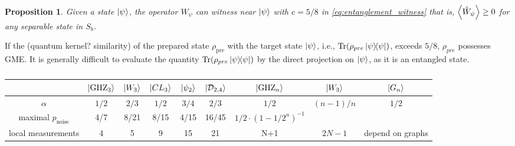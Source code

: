 \documentclass[
aps,
pra,
floatfix,
]{revtex4-2}
\theoremstyle{plain}
\newtheorem{proposition}{Proposition}
\theoremstyle{definition}
\newcommand{\ew}{\hat{W}}
\newcommand{\ghz}{\text{GHZ}}
\newcommand{\noise}{\text{noise}}
\newcommand{\dm}{\rho}
\newcommand{\D}{\mathcal{D}}
\begin{document}
\begin{proposition}\label{thm:entanglement_witness_gme}
	Given a state $\ket{\psi}$,
	the  operator $\ew_{\psi}$ can witness   near $\ket{\psi}$ with $c=5/8$ in \cref{eq:entanglement_witness}
	that is, $\expval{\ew_{\psi}}\ge 0$ for any separable state in $S_b$.
\end{proposition}
If the  (quantum kernel? similarity) of the prepared state $\dm_{\text{pre}}$ with the target state $\ket{\psi}$, i.e., $\Tr(\dm_{pre}\op{\psi})$, exceeds $5/8$, $\dm_{pre}$ possesses GME.
It is generally difficult to evaluate the quantity $\Tr(\dm_{pre}\op{\psi})$ by the direct projection on $\ket{\psi}$, as it is an entangled state.
\begin{table}[!ht]
\centering
\begin{tabular}{c|c|c|c|c|c|c|c|c}
	 & $\ket{\ghz_3}$ & $\ket{W_3}$ & $\ket{CL_3}$ & $\ket{\psi_2}$ & $\ket{\D_{2,4}}$ & $\ket{\ghz_n}$ & $\ket{W_3}$ & $\ket{G_n}$ \\
	\hline
	$\alpha$ & $1/2$ & $2/3$ & $1/2$ & $3/4$ & $2/3$ & $1/2$ & $(n-1)/n$ & $1/2$ \\
	maximal $p_{\noise}$ & 4/7 & 8/21 & 8/15 & 4/15 & 16/45 & $1/2 \cdot (1-1/2^n)^{-1}$ & & \\
	local measurements & 4 & 5 & 9 & 15 & 21 & N+1 & $2N-1$ & depend on graphs \\
	\hline
\end{tabular}
\caption{\cite{guhneEntanglementDetection2009}}
\end{table}
\end{document}
